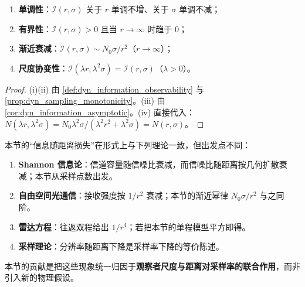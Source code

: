\begin{property}[信息可观测度的基本性质]\label{prop:dyn_information_properties}
\begin{enumerate}[label=(\roman*)]
    \item \textbf{单调性}：$\mathcal I(r,\sigma)$ 关于 $r$ 单调不增、关于 $\sigma$ 单调不减；
    \item \textbf{有界性}：$\mathcal I(r,\sigma)>0$ 且当 $r\to\infty$ 时趋于 $0$；
    \item \textbf{渐近衰减}：$\mathcal I(r,\sigma)\sim N_0\sigma/r^2$（$r\to\infty$）；
    \item \textbf{尺度协变性}：$\mathcal I(\lambda r,\lambda^2\sigma)=\mathcal I(r,\sigma)$（$\lambda>0$）。
\end{enumerate}
\end{property}

\begin{proof}
(i)(ii) 由 \cref{def:dyn_information_observability} 与 \cref{prop:dyn_sampling_monotonicity}。(iii) 由 \cref{cor:dyn_information_asymptotic}。(iv) 直接代入：$N(\lambda r,\lambda^2\sigma)=N_0\lambda^2\sigma/(\lambda^2r^2+\lambda^2\sigma)=N(r,\sigma)$。
\end{proof}

\begin{remark}[与既有理论的对照]\label{rem:dyn_information_distance_compare}
本节的“信息随距离损失”在形式上与下列理论一致，但出发点不同：
\begin{enumerate}[label=(\roman*)]
    \item \textbf{Shannon 信息论}：信道容量随信噪比衰减，而信噪比随距离按几何扩散衰减；本节从采样点数出发。
    \item \textbf{自由空间光通信}：接收强度按 $1/r^2$ 衰减；本节的渐近幂律 $N_0\sigma/r^2$ 与之同阶。
    \item \textbf{雷达方程}：往返双程给出 $1/r^4$；若把本节的单程模型平方即得。
    \item \textbf{采样理论}：分辨率随距离下降是采样率下降的等价陈述。
\end{enumerate}
本节的贡献是把这些现象统一归因于\textbf{观察者尺度与距离对采样率的联合作用}，而非引入新的物理假设。
\end{remark}


